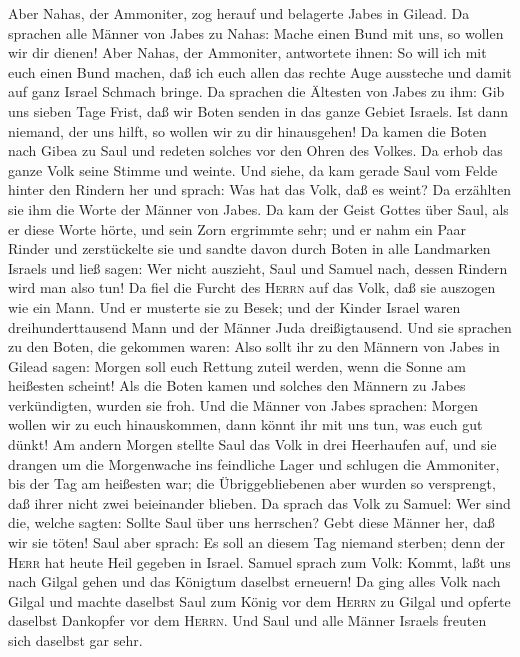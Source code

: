  Aber Nahas, der Ammoniter, zog herauf und belagerte Jabes
in Gilead. Da sprachen alle Männer von Jabes zu Nahas: Mache einen Bund
mit uns, so wollen wir dir dienen!  Aber Nahas, der
Ammoniter, antwortete ihnen: So will ich mit euch einen Bund machen, daß
ich euch allen das rechte Auge aussteche und damit auf ganz Israel
Schmach bringe.  Da sprachen die Ältesten von Jabes zu
ihm: Gib uns sieben Tage Frist, daß wir Boten senden in das ganze Gebiet
Israels. Ist dann niemand, der uns hilft, so wollen wir zu dir
hinausgehen!  Da kamen die Boten nach Gibea zu Saul und
redeten solches vor den Ohren des Volkes. Da erhob das ganze Volk seine
Stimme und weinte.  Und siehe, da kam gerade Saul vom
Felde hinter den Rindern her und sprach: Was hat das Volk, daß es weint?
Da erzählten sie ihm die Worte der Männer von Jabes.  Da
kam der Geist Gottes über Saul, als er diese Worte hörte, und sein Zorn
ergrimmte sehr;  und er nahm ein Paar Rinder und
zerstückelte sie und sandte davon durch Boten in alle Landmarken Israels
und ließ sagen: Wer nicht auszieht, Saul und Samuel nach, dessen Rindern
wird man also tun! Da fiel die Furcht des \textsc{Herrn} auf das Volk,
daß sie auszogen wie ein Mann.  Und er musterte sie zu
Besek; und der Kinder Israel waren dreihunderttausend Mann und der
Männer Juda dreißigtausend.  Und sie sprachen zu den
Boten, die gekommen waren: Also sollt ihr zu den Männern von Jabes in
Gilead sagen: Morgen soll euch Rettung zuteil werden, wenn die Sonne am
heißesten scheint! Als die Boten kamen und solches den Männern zu Jabes
verkündigten, wurden sie froh.  Und die Männer von Jabes
sprachen: Morgen wollen wir zu euch hinauskommen, dann könnt ihr mit uns
tun, was euch gut dünkt!  Am andern Morgen stellte Saul
das Volk in drei Heerhaufen auf, und sie drangen um die Morgenwache ins
feindliche Lager und schlugen die Ammoniter, bis der Tag am heißesten
war; die Übriggebliebenen aber wurden so versprengt, daß ihrer nicht
zwei beieinander blieben.  Da sprach das Volk zu Samuel:
Wer sind die, welche sagten: Sollte Saul über uns herrschen? Gebt diese
Männer her, daß wir sie töten!  Saul aber sprach: Es soll
an diesem Tag niemand sterben; denn der \textsc{Herr} hat heute Heil
gegeben in Israel.  Samuel sprach zum Volk: Kommt, laßt
uns nach Gilgal gehen und das Königtum daselbst erneuern!
 Da ging alles Volk nach Gilgal und machte daselbst Saul
zum König vor dem \textsc{Herrn} zu Gilgal und opferte daselbst
Dankopfer vor dem \textsc{Herrn}. Und Saul und alle Männer Israels
freuten sich daselbst gar sehr.

